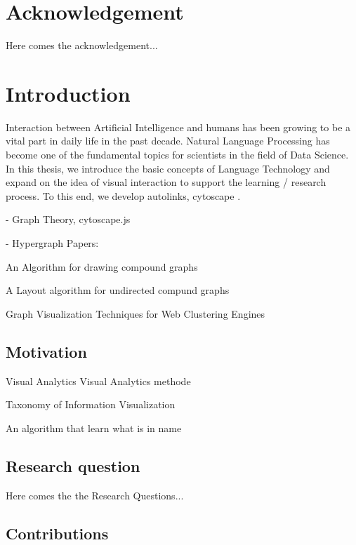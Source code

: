 \documentclass[
    fontsize=12pt,
    headings=small,
    parskip=half,           %
    bibliography=totoc,
    numbers=noenddot,       %
    open=any,               %
    ]{scrreprt}
\begin{document}
\chapter*{Acknowledgement}

Here comes the acknowledgement...


\tableofcontents

\chapter{Introduction}

Interaction between Artificial Intelligence and humans has been growing to be a vital part in daily life in the past decade. Natural Language Processing has become one of the fundamental topics for scientists in the field of Data Science. In this thesis, we introduce the basic concepts of Language Technology and expand on the idea of visual interaction to support the learning / research process. To this end, we develop autolinks, cytoscape \cite{doi:10.1093/bioinformatics/btv557}.

- Graph Theory, cytoscape.js \cite{doi:10.1093/bioinformatics/btv557}

- Hypergraph Papers: 

An Algorithm for drawing compound graphs \cite{10.1007/3-540-46648-7_20}

A Layout algorithm for undirected compund graphs \cite{DOGRUSOZ2009980}

Graph Visualization Techniques for Web Clustering Engines \cite{406923}

\section{Motivation}

Visual Analytics \cite{1573625}
Visual Analytics methode \cite{1333626}

Taxonomy of Information Visualization \cite{545307}


An algorithm that learn what is in name \cite{Bikel1999}


\section{Research question}

Here comes the the Research Questions...


\section{Contributions}
\end{document}

